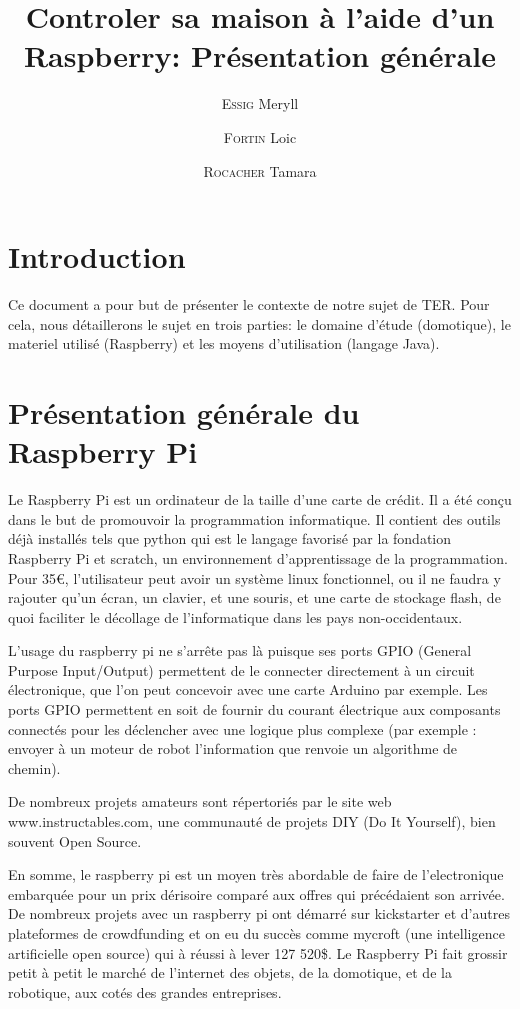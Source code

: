 \documentclass{article}
\title{Controler sa maison à l'aide d'un Raspberry:  Présentation générale}
\author{\textsc{Essig} Meryll \and \textsc{Fortin} Loic \and \textsc{Rocacher} Tamara}
\begin{document}
\maketitle

\section*{Introduction}
Ce document a pour but de présenter le contexte de notre sujet de TER. Pour cela, nous détaillerons le sujet en trois parties: le domaine d'étude (domotique), le materiel utilisé (Raspberry) et les moyens d'utilisation (langage Java).

\section*{Présentation générale du Raspberry Pi}
Le Raspberry Pi est un ordinateur de la taille d'une carte de crédit. Il a été conçu dans le but de promouvoir la programmation informatique. Il contient des outils déjà installés tels que python qui est le langage favorisé par la fondation Raspberry Pi et scratch, un environnement d'apprentissage de la programmation. Pour 35\euro{}, l'utilisateur peut avoir un système linux fonctionnel, ou il ne faudra y rajouter qu'un écran, un clavier, et une souris, et une carte de stockage flash, de quoi faciliter le décollage de l'informatique dans les pays non-occidentaux.

L'usage du raspberry pi ne s'arrête pas là puisque ses ports GPIO (General Purpose Input/Output) permettent de le connecter directement à un circuit électronique, que l'on peut concevoir avec une carte Arduino par exemple. Les ports GPIO permettent en soit de fournir du courant électrique aux composants connectés pour les déclencher avec une logique plus complexe (par exemple : envoyer à un moteur de robot l'information que renvoie un algorithme de chemin).

De nombreux projets amateurs sont répertoriés par le site web\\ www.instructables.com, une communauté de projets DIY (Do It Yourself), bien souvent Open Source.

En somme, le raspberry pi est un moyen très abordable de faire de l'electronique embarquée pour un prix dérisoire comparé aux offres qui précédaient son arrivée. De nombreux projets avec un raspberry pi ont démarré sur kickstarter et d'autres plateformes de crowdfunding et on eu du succès comme mycroft (une intelligence artificielle open source) qui à réussi à lever 127 520\$. Le Raspberry Pi fait grossir petit à petit le marché de l'internet des objets, de la domotique, et de la robotique, aux cotés des grandes entreprises. 
\end{document}
